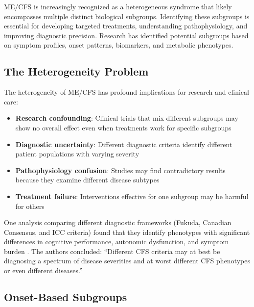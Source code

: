 
ME/CFS is increasingly recognized as a heterogeneous syndrome that likely encompasses multiple distinct biological subgroups. Identifying these subgroups is essential for developing targeted treatments, understanding pathophysiology, and improving diagnostic precision. Research has identified potential subgroups based on symptom profiles, onset patterns, biomarkers, and metabolic phenotypes.

\subsection{The Heterogeneity Problem}

The heterogeneity of ME/CFS has profound implications for research and clinical care:

\begin{itemize}
    \item \textbf{Research confounding}: Clinical trials that mix different subgroups may show no overall effect even when treatments work for specific subgroups
    \item \textbf{Diagnostic uncertainty}: Different diagnostic criteria identify different patient populations with varying severity \cite{Brown2013phenotypes}
    \item \textbf{Pathophysiology confusion}: Studies may find contradictory results because they examine different disease subtypes
    \item \textbf{Treatment failure}: Interventions effective for one subgroup may be harmful for others
\end{itemize}

One analysis comparing different diagnostic frameworks (Fukuda, Canadian Consensus, and ICC criteria) found that they identify phenotypes with significant differences in cognitive performance, autonomic dysfunction, and symptom burden \cite{Brown2013phenotypes}. The authors concluded: ``Different CFS criteria may at best be diagnosing a spectrum of disease severities and at worst different CFS phenotypes or even different diseases.''

\subsection{Onset-Based Subgroups}

